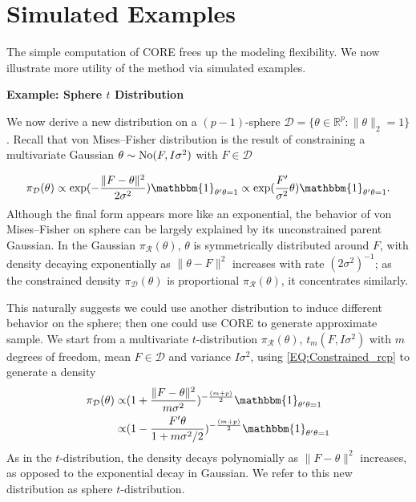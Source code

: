\documentclass[10pt,fleqn]{article}
\newcommand{\be}{\begin{equation}\begin{aligned} }
\newcommand{\ee}{\end{aligned}\end{equation} }
\newcommand{\bb}[1]{\mathbb{#1}} \newcommand{\mc}[1]{\mathcal{#1}}
\DeclareMathOperator{\1}{\mathbbm{1}} \DeclareMathOperator{\bigO}{\mc O}
\begin{document}
\section{Simulated Examples}

The simple computation of CORE frees up the modeling flexibility. We now illustrate more utility of the method via simulated examples.

\textbf{Example: Sphere $t$ Distribution}

We now derive a new distribution on a $(p-1)$-sphere $\mc
D=\{\theta\in
\bb R^p:\|\theta\|_2 =1\}$. Recall that von
Mises--Fisher distribution \citep{khatri1977mises} is the result of
constraining a multivariate Gaussian $\theta \sim \operatorname{No}(F,I\sigma^2)$ with
$F\in \mc D$ 

$$
\pi_{\mc D}(\theta) \propto
\exp(-\frac{\|F-\theta\|^2}{2\sigma^2})
\mathbbm{1}_{\theta'\theta=1} \\
\propto
\exp(\frac{F'}{\sigma^2}\theta)
\mathbbm{1}_{\theta'\theta=1}.
$$
Although the final form
appears more
like an exponential, the behavior of von
Mises--Fisher
on sphere can be largely explained by its unconstrained parent Gaussian.
In the Gaussian $\pi_{\mc
R}(\theta)$, $\theta$ is symmetrically distributed around $F$, with density
decaying exponentially as $\| \theta-F\|^2$ increases with rate
$({2\sigma^2})^{-1}$; as the constrained
density $\pi_{\mc D}(\theta)$ is proportional $\pi_{\mc R}(\theta)$, it concentrates
similarly.

This naturally suggests we could use another distribution to induce different behavior on the sphere; then one could use CORE to generate approximate sample. We start from a
multivariate $t$-distribution $\pi_{\mc
R}(\theta)$, $t_m(F,I\sigma^2)$ with $m$ degrees of freedom,
mean $F\in \mc D$ and variance $I\sigma^2$, using \eqref{EQ:Constrained_rcp} to generate a density
\be
\pi_{\mc
D}(\theta)
\propto &
(1+\frac{\|F-\theta\|^2}{m\sigma^2})^{-\frac{(m+p)}{2}}\mathbbm{1}_{\theta'\theta=1}\\
\propto &
(1-\frac{F'\theta}{1+m\sigma^2/2})^{-\frac{(m+p)}{2}}\mathbbm{1}_{\theta'\theta=1}
\ee
As in the $t$-distribution, the density decays polynomially as $\|F-\theta\|^2$ increases, as opposed to the exponential decay in Gaussian. We refer to this new distribution as sphere $t$-distribution.
\end{document}
